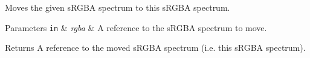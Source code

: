 Moves the given s\+R\+G\+BA spectrum to this s\+R\+G\+BA spectrum.


\begin{DoxyParams}[1]{Parameters}
\mbox{\tt in}  & {\em rgba} & A reference to the s\+R\+G\+BA spectrum to move. \\
\hline
\end{DoxyParams}
\begin{DoxyReturn}{Returns}
A reference to the moved s\+R\+G\+BA spectrum (i.\+e. this s\+R\+G\+BA spectrum). 
\end{DoxyReturn}
